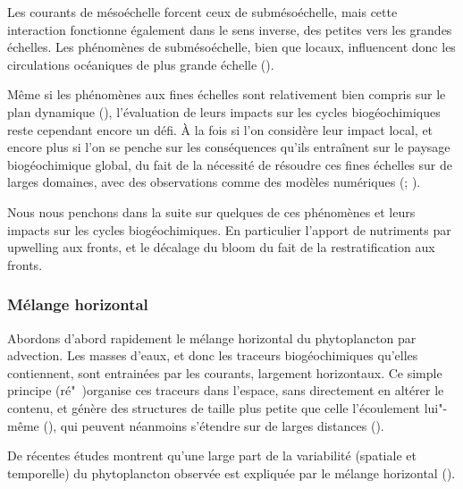 Les courants de mésoéchelle forcent ceux de submésoéchelle, mais cette interaction fonctionne également dans le sens inverse, des petites vers les grandes échelles.
Les phénomènes de submésoéchelle, bien que locaux, influencent donc les circulations océaniques de plus grande échelle (\cite{sasaki_2020, balwada_2022, naveiragarabato_2022, taylor_2023}).


Même si les phénomènes aux fines échelles sont relativement bien compris sur le plan dynamique (\cite{mcwilliams_2016, mcwilliams_2019, gula_2022, taylor_2023}), l'évaluation de leurs impacts sur les cycles biogéochimiques reste cependant encore un défi.
À la fois si l'on considère leur impact local, et encore plus si l'on se penche sur les conséquences qu'ils entraînent sur le paysage biogéochimique global, du fait de la nécessité de résoudre ces fines échelles sur de larges domaines, avec des observations comme des modèles numériques (\cite{fox-kemper_2019}; ).

Nous nous penchons dans la suite sur quelques de ces phénomènes et leurs impacts sur les cycles biogéochimiques.
En particulier l'apport de nutriments par upwelling aux fronts, et le décalage du bloom du fait de la restratification aux fronts.

\subsubsection{Mélange horizontal}

Abordons d'abord rapidement le mélange horizontal du phytoplancton par advection.
Les masses  d'eaux, et donc les traceurs biogéochimiques qu'elles contiennent, sont entrainées par les courants, largement horizontaux.
Ce simple principe (ré"~)organise ces traceurs dans l'espace, sans directement en altérer le contenu, et génère des structures de taille plus petite que celle l'écoulement lui"-même  (\cite{abraham_1998, lehahn_2007, dovidio_2010, levy_2018}), qui peuvent néanmoins s'étendre sur de larges distances (\cite{sergi_2020}).

De récentes études montrent qu'une large part de la variabilité (spatiale et temporelle) du phytoplancton observée est expliquée par le mélange horizontal (\cite{glover_2018, keerthi_2022, jonsson_2023}).

